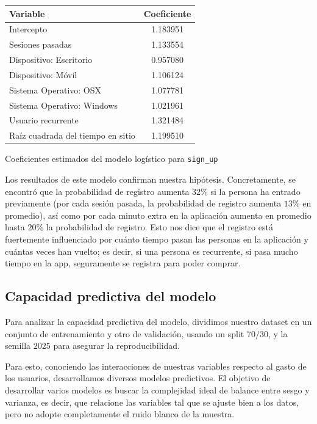 \documentclass[conference]{IEEEtran}
\begin{document}
\begin{table}[H]
\centering
\begin{tabular}{l c}
\hline
\textbf{Variable} & \textbf{Coeficiente} \\
\hline
Intercepto             & 1.183951 \\
Sesiones pasadas       & 1.133554 \\
Dispositivo: Escritorio & 0.957080 \\
Dispositivo: Móvil      & 1.106124 \\
Sistema Operativo: OSX  & 1.077781 \\
Sistema Operativo: Windows & 1.021961 \\
Usuario recurrente      & 1.321484 \\
Raíz cuadrada del tiempo en sitio & 1.199510 \\
\hline
\end{tabular}

\hfill \break

Coeficientes estimados del modelo logístico para \texttt{sign\_up}

\end{table}

Los resultados de este modelo confirman nuestra hipótesis. Concretamente, se encontró que la probabilidad de registro aumenta $32$\% si la persona ha entrado previamente (por cada sesión pasada, la probabilidad de registro aumenta $13$\% en promedio), así como por cada minuto extra en la aplicación aumenta en promedio hasta $20$\% la probabilidad de registro. Esto nos dice que el registro está fuertemente influenciado por cuánto tiempo pasan las personas en la aplicación y cuántas veces han vuelto; es decir, si una persona es recurrente, si pasa mucho tiempo en la app, seguramente se registra para poder comprar. 


\subsection{Capacidad predictiva del modelo}

Para analizar la capacidad predictiva del modelo, dividimos nuestro dataset en un conjunto de entrenamiento y otro de validación, usando un split $70/30$, y la semilla $2025$ para asegurar la reproducibilidad.

Para esto, conociendo las interacciones de nuestras variables respecto al gasto de los usuarios, desarrollamos diversos modelos predictivos. El objetivo de desarrollar varios modelos es buscar la complejidad ideal de balance entre sesgo y varianza, es decir, que relacione las variables tal que se ajuste bien a los datos, pero no adopte completamente el ruido blanco de la muestra.
\end{document}
